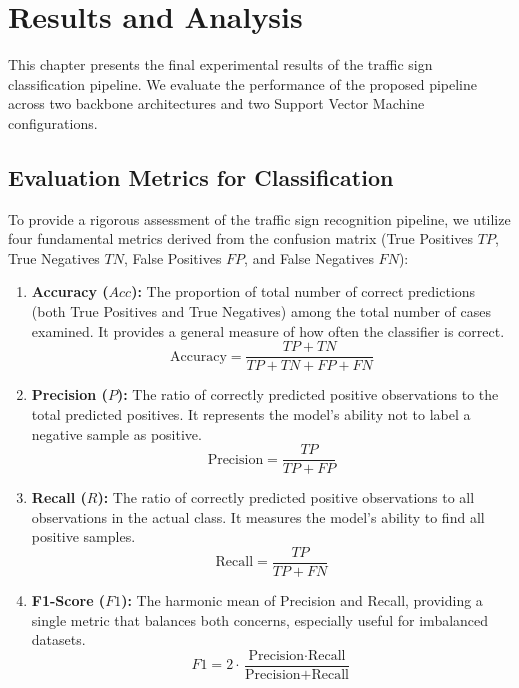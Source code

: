 \chapter{Results and Analysis}

This chapter presents the final experimental results of the traffic sign classification pipeline. We evaluate the performance of the proposed pipeline across two backbone architectures and two Support Vector Machine configurations.

\section{Evaluation Metrics for Classification}
To provide a rigorous assessment of the traffic sign recognition pipeline, we utilize four fundamental metrics derived from the confusion matrix (True Positives $TP$, True Negatives $TN$, False Positives $FP$, and False Negatives $FN$):

\begin{enumerate}
    \item \textbf{Accuracy ($Acc$):} The proportion of total number of correct predictions (both True Positives and True Negatives) among the total number of cases examined. It provides a general measure of how often the classifier is correct.
    \begin{equation}
        \text{Accuracy} = \frac{TP + TN}{TP + TN + FP + FN}
    \end{equation}

    \item \textbf{Precision ($P$):} The ratio of correctly predicted positive observations to the total predicted positives. It represents the model's ability not to label a negative sample as positive.
    \begin{equation}
        \text{Precision} = \frac{TP}{TP + FP}
    \end{equation}
    
    \item \textbf{Recall ($R$):} The ratio of correctly predicted positive observations to all observations in the actual class. It measures the model's ability to find all positive samples.
    \begin{equation}
        \text{Recall} = \frac{TP}{TP + FN}
    \end{equation}
    
    \item \textbf{F1-Score ($F1$):} The harmonic mean of Precision and Recall, providing a single metric that balances both concerns, especially useful for imbalanced datasets.
    \begin{equation}
        F1 = 2 \cdot \frac{\text{Precision} \cdot \text{Recall}}{\text{Precision} + \text{Recall}}
    \end{equation}
\end{enumerate}

